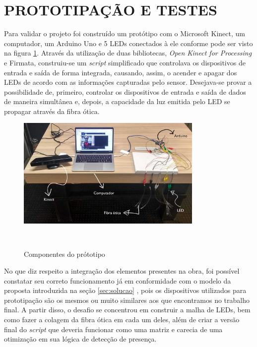 \section{PROTOTIPAÇÃO E TESTES}

Para validar o projeto foi construído um protótipo com o Microsoft Kinect, um computador, um Arduino Uno e 5 LEDs conectados à ele conforme pode ser visto na figura \ref{fig:prototipo}. Através da utilização de duas bibliotecas, \textit{Open Kinect for Processing} e Firmata, construiu-se um \textit{script} simplificado que controlava os dispositivos de entrada e saída de forma integrada, causando, assim, o acender e apagar dos LEDs de acordo com as informações capturadas pelo sensor. Desejava-se provar a possibilidade de, primeiro, controlar os dispositivos de entrada e saída de dados de maneira simultânea e, depois, a capacidade da luz emitida pelo LED se propagar através da fibra ótica.

\begin{figure}[H]
  \begin{center}
    \caption{Componentes do prótotipo}
    \vspace*{0,2cm}
    \includegraphics[width=0.8\textwidth]{./04-figuras/prototipo}
    \label{fig:prototipo}
  \end{center}
  \vspace*{-0,5cm}
  \\
\end{figure}

No que diz respeito a integração dos elementos presentes na obra, foi possível constatar seu correto funcionamento já em conformidade com o modelo da proposta introduzida na seção \ref{sec:solucao} , pois os dispositivos utilizados para prototipação são os mesmos ou muito similares aos que encontramos no trabalho final. A partir disso, o desafio se concentrou em construir a malha de LEDs, bem como fazer a colagem da fibra ótica em cada um deles, além de criar a versão final do \textit{script} que deveria funcionar como uma matriz e carecia de uma otimização em sua lógica de detecção de presença.

